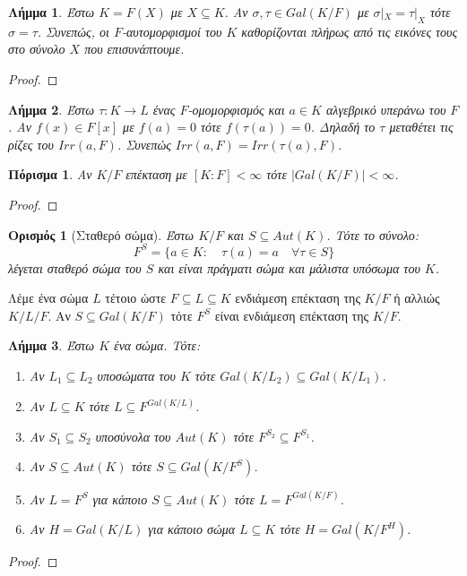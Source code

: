 \documentclass[oneside,a4paper]{article}
\newtheorem{lemma}{Λήμμα}
\newtheorem*{defn}{Ορισμός}
\newtheorem{cor}{Πόρισμα}
\begin{document}
\begin{lemma}
	Έστω $K=F(X)$ με $X \subseteq K$. Αν $\sigma , \tau \in Gal(K/F)$ με $\sigma|_X = \tau|_X $ τότε $\sigma = \tau$. Συνεπώς, οι $F$-αυτομορφισμοί του $K$ καθορίζονται πλήρως από τις εικόνες τους στο σύνολο $X$ που επισυνάπτουμε.
\end{lemma}

\begin{proof}
\end{proof}



\begin{lemma}
	Έστω $\tau : K \rightarrow L$ ένας $F$-ομομορφισμός και $a \in K$ αλγεβρικό υπεράνω του $F$. Αν $f(x) \in F[x]$ με $f(a)=0$ τότε $f(\tau(a)) = 0$. Δηλαδή το $\tau$ μεταθέτει τις ρίζες του $Irr(a,F)$. Συνεπώς $Irr(a,F) = Irr(\tau(a),F)$.
\end{lemma}

\begin{cor}
	Αν $K/F$ επέκταση με $[K:F]<\infty$ τότε $|Gal(K/F)| <\infty$.
\end{cor}
\begin{proof}
\end{proof}

\begin{defn}[Σταθερό σώμα]
	Έστω $K/F$ και $S \subseteq Aut(K)$. Τότε το σύνολο:
	$$F^S = \{a \in K: \quad \tau(a) = a \quad\forall \tau \in S\}$$
	λέγεται σταθερό σώμα του $S$ και είναι πράγματι σώμα και μάλιστα υπόσωμα του $K$.
\end{defn}

Λέμε ένα σώμα $L$ τέτοιο ώστε $F \subseteq L \subseteq K$ ενδιάμεση επέκταση της $K/F$ ή αλλιώς $K/L/F$. Αν $S\subseteq Gal(K/F)$ τότε $F^S$ είναι ενδιάμεση επέκταση της $K/F$.

\begin{lemma}
	\label{duo ennia}
	Έστω $K$ ένα σώμα. Τότε:
	\begin{enumerate}
		\item Αν $L_1 \subseteq L_2$ υποσώματα του $K$ τότε $Gal(K/L_2) \subseteq Gal(K/L_1)$.
		\item Αν $L\subseteq K$ τότε $L \subseteq F^{Gal(K/L)}$.
		\item Αν $S_1 \subseteq S_2$ υποσύνολα του $Aut(K)$ τότε $F^{S_2} \subseteq F^{S_1}$.
		\item Αν $S \subseteq Aut(K)$ τότε $S\subseteq Gal(K/F^S)$.
		\item Αν $L = F^S$ για κάποιο $S\subseteq Aut(K)$ τότε $L = F^{Gal(K/F)}$.
		\item Αν $H = Gal(K/L)$ για κάποιο σώμα $L \subseteq K$ τότε $H = Gal(K/F^H)$.
	\end{enumerate}
\end{lemma}
\begin{proof}
\end{proof}
\end{document}

